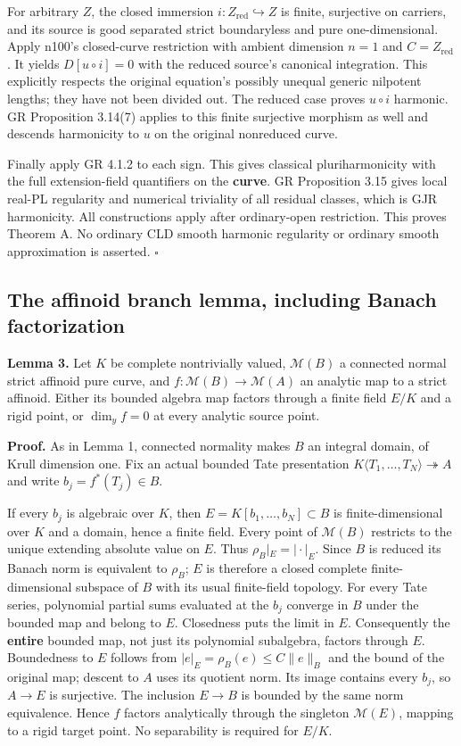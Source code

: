 \documentclass[
  11pt,
]{article}
\begin{document}
For arbitrary \(Z\), the closed immersion
\(i:Z_{\mathrm{red}}\hookrightarrow Z\) is finite, surjective on
carriers, and its source is good separated strict boundaryless and pure
one-dimensional. Apply n100's closed-curve restriction with ambient
dimension \(n=1\) and \(C=Z_{\mathrm{red}}\). It yields
\(D[u\circ i]=0\) with the reduced source's canonical integration. This
explicitly respects the original equation's possibly unequal generic
nilpotent lengths; they have not been divided out. The reduced case
proves \(u\circ i\) harmonic. GR Proposition 3.14(7) applies to this
finite surjective morphism as well and descends harmonicity to \(u\) on
the original nonreduced curve.

Finally apply GR 4.1.2 to each sign. This gives classical
pluriharmonicity with the full extension-field quantifiers on the
\textbf{curve}. GR Proposition 3.15 gives local real-PL regularity and
numerical triviality of all residual classes, which is GJR harmonicity.
All constructions apply after ordinary-open restriction. This proves
Theorem A. No ordinary CLD smooth harmonic regularity or ordinary smooth
approximation is asserted. \(\square\)

\subsection{The affinoid branch lemma, including Banach
factorization}\label{the-affinoid-branch-lemma-including-banach-factorization}

\textbf{Lemma 3.} Let \(K\) be complete nontrivially valued,
\(\mathcal M(B)\) a connected normal strict affinoid pure curve, and
\(f:\mathcal M(B)\to\mathcal M(A)\) an analytic map to a strict
affinoid. Either its bounded algebra map factors through a finite field
\(E/K\) and a rigid point, or \(\dim_y f=0\) at every analytic source
point.

\textbf{Proof.} As in Lemma 1, connected normality makes \(B\) an
integral domain, of Krull dimension one. Fix an actual bounded Tate
presentation \(K\langle T_1,\ldots,T_N\rangle\twoheadrightarrow A\) and
write \(b_j=f^*(T_j)\in B\).

If every \(b_j\) is algebraic over \(K\), then
\(E=K[b_1,\ldots,b_N]\subset B\) is finite-dimensional over \(K\) and a
domain, hence a finite field. Every point of \(\mathcal M(B)\) restricts
to the unique extending absolute value on \(E\). Thus
\(\rho_B|_E=|\cdot|_E\). Since \(B\) is reduced its Banach norm is
equivalent to \(\rho_B\); \(E\) is therefore a closed complete
finite-dimensional subspace of \(B\) with its usual finite-field
topology. For every Tate series, polynomial partial sums evaluated at
the \(b_j\) converge in \(B\) under the bounded map and belong to \(E\).
Closedness puts the limit in \(E\). Consequently the \textbf{entire}
bounded map, not just its polynomial subalgebra, factors through \(E\).
Boundedness to \(E\) follows from \(|e|_E=\rho_B(e)\leq C\|e\|_B\) and
the bound of the original map; descent to \(A\) uses its quotient norm.
Its image contains every \(b_j\), so \(A\to E\) is surjective. The
inclusion \(E\to B\) is bounded by the same norm equivalence. Hence
\(f\) factors analytically through the singleton \(\mathcal M(E)\),
mapping to a rigid target point. No separability is required for
\(E/K\).
\end{document}
